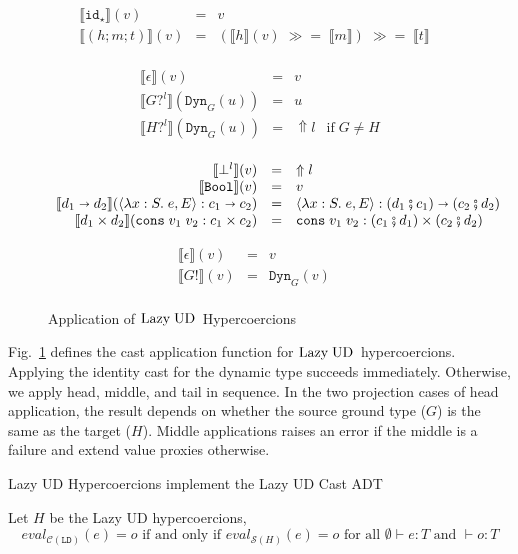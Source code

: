 \documentclass[runningheads]{llncs}
\newcommand{\sidecond}[1]{\text{if}\;#1}
\newcommand{\figequalto}[3]{#1 & = & #2 & #3 \\}
\newcommand{\LUD}{\ensuremath{\text{Lazy\;UD}}}
\newcommand{\CMachine}[1]{\ensuremath{\mathcal{C}(#1)}}
\newcommand{\LDMachine}{\CMachine{\BLD}}
\newcommand{\SMachine}[1]{\ensuremath{\mathcal{S}(#1)}}
\newcommand{\error}[1]{\ensuremath{\Uparrow#1}}
\newcommand{\Tdyn}[0]{\ensuremath{\star}}
\newcommand{\Pbool}[0]{\ensuremath{\mathtt{Bool}}}
\newcommand{\Pfunc}[2]{\ensuremath{#1 \shortrightarrow #2}}
\newcommand{\Pprod}[2]{\ensuremath{#1 \times #2}}
\newcommand{\elam}[3]{\lambda#1:#2.\;#3}
\newcommand{\econs}[2]{\mathtt{cons} \; #1 \; #2}
\newcommand{\ecast}[2]{\ensuremath{#1 : #2}}
\newcommand{\vdyn}[2]{\mathtt{Dyn}_{#1}(#2)}
\newcommand{\vfunc}[4]{\langle\elam{#1}{#2}{#3},#4\rangle}
\newcommand{\vcons}[2]{\econs{#1}{#2}}
\newcommand{\BLD}[0]{\ensuremath{\mathtt{LD}}}
\newcommand{\cnfid}[1]{\ensuremath{\mathtt{id}_{#1}}}
\newcommand{\hcci}[0]{\cnfid{\Tdyn}}
\newcommand{\hccc}[3]{\ensuremath{(#1;#2;#3)}}
\newcommand{\hche}[0]{\ensuremath{\epsilon}}
\newcommand{\hchp}[2]{\ensuremath{#1?^{#2}}}
\newcommand{\hcmbool}[0]{\Pbool}
\newcommand{\hcmfunc}[2]{\Pfunc{#1}{#2}}
\newcommand{\hcmprod}[2]{\Pprod{#1}{#2}}
\newcommand{\hcmfail}[1]{\ensuremath{\bot^l}}
\newcommand{\hcte}[0]{\ensuremath{\epsilon}}
\newcommand{\hcti}[1]{\ensuremath{#1!}}
\newcommand{\mbind}[0]{\ensuremath{\;\gg=\;}}
\newcommand{\denote}[1]{\ensuremath{\llbracket #1 \rrbracket}}
\newcommand{\compose}[2]{\ensuremath{#1 \fatsemi #2}}
\newcommand{\expressiontyping}[3]{\ensuremath{#1 \vdash #2 : #3}}
\newcommand{\valuetyping}[2]{\ensuremath{\vdash #1 : #2}}
\newcommand{\withmachineevalto}[3]{\ensuremath{\mathit{eval}_{#1}(#2)=#3}}
\newcommand{\machineequiv}[2]{
	\ensuremath{
		\withmachineevalto{#1}{e}{o}	
		\text{ if and only if }
		\withmachineevalto{#2}{e}{o}
		\text{ for all }
		\expressiontyping{\emptyset}{e}{T}
		\text{ and }
		\valuetyping{o}{T}
	}}
\begin{document}
\begin{figure}
	\fbox{$\denote{c}_c(v)=r$}
	\[
	\begin{array}{rclr}
	\figequalto{\denote{\hcci}(v)}{v}{}
	\figequalto{\denote{\hccc{h}{m}{t}}(v)}{
		(\denote{h}(v) \mbind \denote{m})
		\mbind \denote{t}
	}{}
	\end{array}
	\]
	
	\fbox{$\denote{h}_h(v)=r$}
	\[
	\begin{array}{rclr}
	\figequalto{\denote{\hche}(v)}{v}{}
	\figequalto{\denote{\hchp{G}{l}}(\vdyn{G}{u})}{u}{}
	\figequalto{\denote{\hchp{H}{l}}(\vdyn{G}{u})}{\error{l}}{
		\sidecond{G \neq H}
	}
	\end{array}
	\]
	
	\fbox{$\denote{m}_m(v)=r$}
	\[
	\begin{array}{rclr}
	\figequalto{\denote{\hcmfail{l}}(v)}{\error{l}}{}
	\figequalto{\denote{\hcmbool}(v)}{v}{}
	\figequalto{\denote{\hcmfunc{d_1}{d_2}}(\ecast{\vfunc{x}{S}{e}{E}}{\Pfunc{c_1}{c_2}})}{
		\ecast{\vfunc{x}{S}{e}{E}}{\Pfunc{(\compose{d_1}{c_1})}{(\compose{c_2}{d_2})}}
	}{}
	\figequalto{\denote{\hcmprod{d_1}{d_2}}(\ecast{\vcons{v_1}{v_2}}{\Pprod{c_1}{c_2}})}{
		\ecast{\vcons{v_1}{v_2}}{\Pprod{(\compose{c_1}{d_1})}{(\compose{c_2}{d_2})}}
	}{}
	\end{array}
	\]
	
	\fbox{$\denote{t}_t(v)=r$}
	\[
	\begin{array}{rclr}
	\figequalto{\denote{\hcte}(v)}{v}{}
	\figequalto{\denote{\hcti{G}}(v)}{\vdyn{G}{v}}{}
	\end{array}
	\]
	\caption{Application of \LUD\ Hypercoercions}
	\label{fig:LazyUD-Hypercoercions-application}
\end{figure}

Fig.~\ref{fig:LazyUD-Hypercoercions-application} defines the cast application 
function for \LUD\ hypercoercions.
Applying the identity cast for the dynamic type succeeds immediately. 
Otherwise, we apply head, middle, and tail in sequence. 
%
In the two projection cases of head application, the result depends on whether 
the source ground type ($G$) is the same as the target ($H$).
%
Middle applications raises an error if the middle is a failure and extend value 
proxies otherwise.

\begin{proposition} Lazy UD Hypercoercions implement the Lazy UD Cast ADT
\end{proposition}
\begin{theorem} Let $H$ be the Lazy UD 
	hypercoercions,
	\[\machineequiv{\LDMachine}{\SMachine{H}}\]
\end{theorem}
\end{document}
